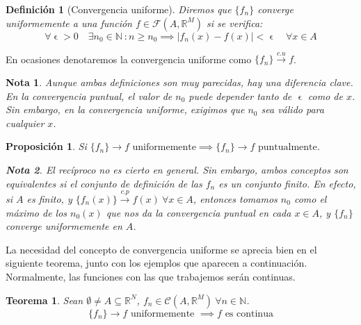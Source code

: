 \documentclass[11pt, a4paper]{article}
\let\epsilon\upvarepsilon
\providecommand{\abs}[1]{\lvert#1\rvert}
\newcommand{\R}{\mathbb{R}}
\newcommand{\N}{\mathbb{N}}
\newcommand{\fn}{\{f_n\}}
\theoremstyle{theorem-style}
\newtheorem{nth}{Teorema}[section]
\newtheorem*{nprop}{Proposición}
\theoremstyle{definition-style}
\newtheorem*{ndef}{Definición}
\theoremstyle{remark-style}
\newtheorem*{nota}{Nota}
\theoremstyle{example-style}
\begin{document}
\begin{ndef}[Convergencia uniforme] Diremos que $\fn$ converge uniformemente a una función $f \in \mathcal{F}(A,\mathbb{R}^M)$ si se verifica:
	\[
	\forall \epsilon>0 \quad \exists n_0 \in \mathbb{N}\ : n\ge n_0\implies \abs{f_n(x)-f(x)} < \epsilon \quad \forall x \in A
	\]
\end{ndef}

En ocasiones denotaremos la convergencia uniforme como $\fn \xrightarrow {c.u} f$.

\begin{nota}
Aunque ambas definiciones son muy parecidas, hay una diferencia clave. En la convergencia puntual, el valor de $n_0$ puede depender tanto de $\epsilon$ como de $x$. Sin embargo, en la convergencia uniforme, exigimos que $n_0$ sea válido para cualquier $x$.
\end{nota}
 
\begin{nprop}
	Si $\fn\to f \text{ uniformemente} \implies \fn \to f \text{ puntualmente}$. 
	\begin{nota}
	El recíproco no es cierto en general. Sin embargo, ambos conceptos son equivalentes si el conjunto de definición de las $f_n$ es un conjunto finito. En efecto, si $A$ es finito, y $\{f_n(x)\} \xrightarrow {c.p} f(x) \ \forall x \in A$, entonces tomamos $n_0$ como el máximo de los $n_0(x)$ que nos da la convergencia puntual en cada $x \in A$, y $\fn$ converge uniformemente en $A$.  
\end{nota}
\end{nprop}

La necesidad del concepto de convergencia uniforme se aprecia bien en el siguiente teorema, junto con los ejemplos que aparecen a continuación. Normalmente, las funciones con las que trabajemos serán continuas.

\begin{nth}
	Sean $\emptyset \ne A \subseteq \R^N$, $f_n \in \mathcal{C}(A,\R^M)\ \forall n\in \N$.
	\[
	\fn \to f \text{ uniformemente } \implies f \text{ es continua}
	\]
\end{nth}
\end{document}

